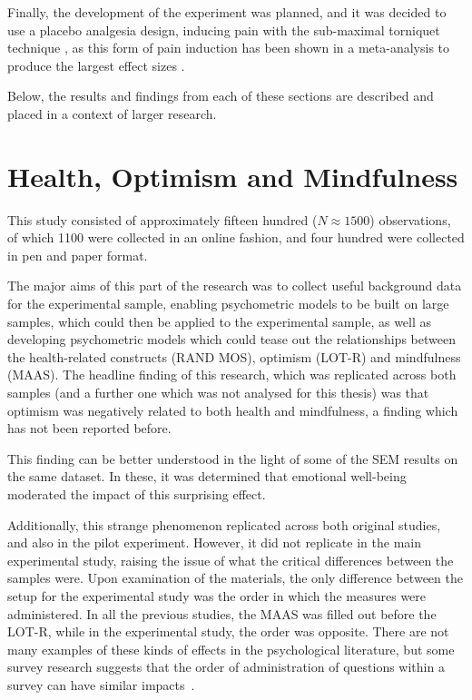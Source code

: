 Finally, the development of the experiment was planned, and it was
decided to use a placebo analgesia design, inducing pain with the
sub-maximal torniquet technique \cite{moore1979submaximal}, as this
form of pain induction has been shown in a meta-analysis to produce
the largest effect sizes \cite{Sauro2005}.

Below, the results and findings from each of these sections are
described and placed in a context of larger research.

\section{Health, Optimism and Mindfulness}
\label{sec:health-optim-mindf}

This study consisted of approximately fifteen hundred ($N \approx
1500$) observations, of which 1100 were collected in an online
fashion, and four hundred were collected in pen and paper format.

The major aims of this part of the research was to collect useful
background data for the experimental sample, enabling psychometric
models to be built on large samples, which could then be applied to
the experimental sample, as well as developing psychometric models
which could tease out the relationships between the health-related
constructs (RAND MOS), optimism (LOT-R) and mindfulness (MAAS). The
headline finding of this research, which was replicated across both
samples (and a further one which was not analysed for this thesis) was
that optimism was negatively related to both health and mindfulness, a
finding which has not been reported before.

This finding can be better understood in the light of some of the SEM
results on the same dataset. In these, it was determined that
emotional well-being moderated the impact of this surprising effect.


Additionally, this strange phenomenon replicated across both original
studies, and also in the pilot experiment. However, it did not
replicate in the main experimental study, raising the issue of what
the critical differences between the samples were. Upon examination of
the materials, the only difference between the setup for the
experimental study was the order in which the measures were
administered. In all the previous studies, the MAAS was filled out
before the LOT-R, while in the experimental study, the order was
opposite. There are not many examples of these kinds of effects in the
psychological literature, but some survey research suggests that the
order of administration of questions within a survey can have similar
impacts~\cite{schwarz1999self}.

